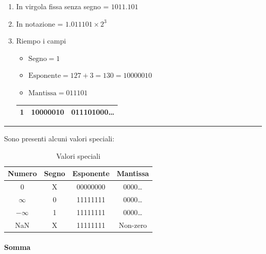\documentclass{article}
\begin{document}
\begin{enumerate}
    \item In virgola fissa senza segno = $1011.101$
    \item In notazione = $1.011101\times 2^3$
    \item Riempo i campi
        \begin{itemize}
            \item $\text{Segno} = 1$
            \item $\text{Esponente} = 127+3 = 130 =10000010 $
            \item $\text{Mantissa} = 011101$
        \end{itemize}
    \begin{table}[ht]
        \centering
        \begin{tabular}{|c|c|c|}
            \hline
             \rule{0pt}{1ex}1 & 10000010 & 011101000\ldots \\
             \hline
        \end{tabular}
        \label{tab:example_floatpoint}
    \end{table}
\end{enumerate}

\noindent\rule{\textwidth}{0.5pt}

\vspace{5pt}

\noindent Sono presenti alcuni valori speciali:

\begin{table}[ht]
    \centering
    \begin{tabular}{|c|c|c|c|}
        \hline
        Numero & Segno & Esponente & Mantissa\\
        \hline
        \rule{0pt}{3ex}0 & X & 00000000 & 0000\ldots\\
        \hline
       \rule{0pt}{3ex}$\infty$ & 0 & 11111111 & 0000\ldots\\
        \hline
        \rule{0pt}{3ex}$-\infty$ & 1 & 11111111 & 0000\ldots\\
        \hline
        \rule{0pt}{3ex}NaN & X & 11111111 & Non-zero\\
        \hline
    \end{tabular}
    \caption{Valori speciali}
    \label{tab:floatpoint_special}
\end{table}

\paragraph{Somma}
\end{document}
